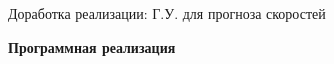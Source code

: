 \documentclass[9pt, ignoreonframetext,unicode]{beamer}
\begin{document}
\begin{frame}{Доработка реализации: Г.У. для прогноза скоростей}
\begin{block}{\textbf{Программная реализация}}
\begin{itemize}
	\end{itemize}
	\end{block}





%
%
%

\end{frame}
\end{document}
